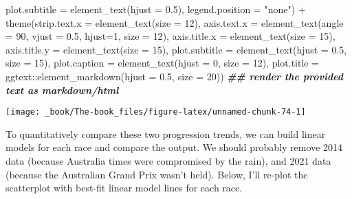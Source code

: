 \documentclass[
]{book}
\newenvironment{Shaded}{\begin{snugshade}}{\end{snugshade}}
\newcommand{\AttributeTok}[1]{\textcolor[rgb]{0.77,0.63,0.00}{#1}}
\newcommand{\DecValTok}[1]{\textcolor[rgb]{0.00,0.00,0.81}{#1}}
\newcommand{\DocumentationTok}[1]{\textcolor[rgb]{0.56,0.35,0.01}{\textbf{\textit{#1}}}}
\newcommand{\FloatTok}[1]{\textcolor[rgb]{0.00,0.00,0.81}{#1}}
\newcommand{\FunctionTok}[1]{\textcolor[rgb]{0.00,0.00,0.00}{#1}}
\newcommand{\NormalTok}[1]{#1}
\newcommand{\SpecialCharTok}[1]{\textcolor[rgb]{0.00,0.00,0.00}{#1}}
\newcommand{\StringTok}[1]{\textcolor[rgb]{0.31,0.60,0.02}{#1}}
\begin{document}
\begin{Shaded}
\begin{Highlighting}[]
        \AttributeTok{plot.subtitle =} \FunctionTok{element\_text}\NormalTok{(}\AttributeTok{hjust =} \FloatTok{0.5}\NormalTok{),}
        \AttributeTok{legend.position =} \StringTok{"none"}\NormalTok{) }\SpecialCharTok{+}
  \FunctionTok{theme}\NormalTok{(}\AttributeTok{strip.text.x =} \FunctionTok{element\_text}\NormalTok{(}\AttributeTok{size =} \DecValTok{12}\NormalTok{),}
        \AttributeTok{axis.text.x =} \FunctionTok{element\_text}\NormalTok{(}\AttributeTok{angle =} \DecValTok{90}\NormalTok{, }\AttributeTok{vjust =} \FloatTok{0.5}\NormalTok{, }\AttributeTok{hjust=}\DecValTok{1}\NormalTok{, }\AttributeTok{size =} \DecValTok{12}\NormalTok{),}
        \AttributeTok{axis.title.x =} \FunctionTok{element\_text}\NormalTok{(}\AttributeTok{size =} \DecValTok{15}\NormalTok{),}
        \AttributeTok{axis.title.y =} \FunctionTok{element\_text}\NormalTok{(}\AttributeTok{size =} \DecValTok{15}\NormalTok{),}
         \AttributeTok{plot.subtitle =} \FunctionTok{element\_text}\NormalTok{(}\AttributeTok{hjust =} \FloatTok{0.5}\NormalTok{, }\AttributeTok{size =} \DecValTok{15}\NormalTok{),}
         \AttributeTok{plot.caption =} \FunctionTok{element\_text}\NormalTok{(}\AttributeTok{hjust =} \DecValTok{0}\NormalTok{, }\AttributeTok{size =} \DecValTok{12}\NormalTok{),}
        \AttributeTok{plot.title =}\NormalTok{ ggtext}\SpecialCharTok{::}\FunctionTok{element\_markdown}\NormalTok{(}\AttributeTok{hjust =} \FloatTok{0.5}\NormalTok{, }\AttributeTok{size =} \DecValTok{20}\NormalTok{)) }\DocumentationTok{\#\# render the provided text as markdown/html}
\end{Highlighting}
\end{Shaded}

\begin{center}\texttt{[image: \_book/The-book\_files/figure-latex/unnamed-chunk-74-1]} \end{center}

To quantitatively compare these two progression trends, we can build linear models for each race and compare the output. We should probably remove 2014 data (because Australia times were compromised by the rain), and 2021 data (because the Australian Grand Prix wasn't held). Below, I'll re-plot the scatterplot with best-fit linear model lines for each race.
\end{document}
